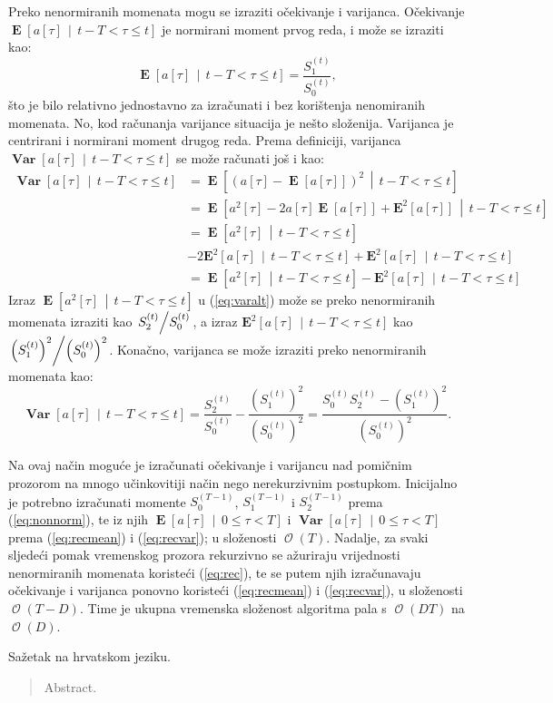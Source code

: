 \documentclass[lmodern, utf8, diplomski, numeric]{fer}
\newcommand{\E}[1]{\operatorname{\mathbf{E}}\q[#1\w]}
\newcommand{\Esq}[1]{\operatorname{\mathbf{E}^2}\q[#1\w]}
\newcommand{\Efromto}[2]{\operatorname{\mathbf{E}}\q[#1\, \middle\vert\, #2\w]}
\newcommand{\Esqfromto}[2]{\operatorname{\mathbf{E}^2}\q[#1\, \middle\vert\, #2\w]}
\newcommand{\Varfromto}[2]{\operatorname{\mathbf{Var}}\q[#1\, \middle\vert\, #2\w]}
\newcommand{\bigO}[1]{\operatorname{\mathcal{O}}\q(#1\w)}
\newcommand{\q}{\left}
\newcommand{\w}{\right}
\begin{document}
  Preko nenormiranih momenata mogu se izraziti očekivanje i varijanca.
  Očekivanje $\Efromto{a\q[\tau\w]}{t - T < \tau \le t}$ je normirani moment prvog reda, i može se izraziti kao:
  \begin{equation}
  \label{eq:recmean}
  \Efromto{a\q[\tau\w]}{t - T < \tau \le t} = \frac{S_1^{(t)}}{S_0^{(t)}},
  \end{equation}
  što je bilo relativno jednostavno za izračunati i bez korištenja nenomiranih momenata.
  No, kod računanja varijance situacija je nešto složenija.
  Varijanca je centrirani i normirani moment drugog reda.
  Prema definiciji, varijanca $\Varfromto{a\q[\tau\w]}{t - T < \tau \le t}$ se može računati još i kao:
  \begin{align}
    \Varfromto{a\q[\tau\w]}{t - T < \tau \le t} &= \Efromto{\q(a\q[\tau\w] - \E{a\q[\tau\w]} \w)^2}{t - T < \tau \le t} \nonumber \\
    &= \Efromto{a^2\q[\tau\w] - 2 a\q[\tau\w] \E{a\q[\tau\w]} + \Esq{a\q[\tau\w]}}{t - T < \tau \le t} \nonumber \\
    &= \Efromto{a^2\q[\tau\w]}{t - T < \tau \le t} \nonumber \\
    & - 2\Esqfromto{a\q[\tau\w]}{t - T < \tau \le t} + \Esqfromto{a\q[\tau\w]}{t - T < \tau \le t} \nonumber \\
    \label{eq:varalt}
    &= \Efromto{a^2\q[\tau\w]}{t - T < \tau \le t} - \Esqfromto{a\q[\tau\w]}{t - T < \tau \le t}
  \end{align}
  Izraz $\Efromto{a^2\q[\tau\w]}{t - T < \tau \le t}$ u (\ref{eq:varalt}) može se preko nenormiranih momenata izraziti kao $\q. S_2^{(t)} \middle/ S_0^{(t)} \w.$,
  a izraz $\Esqfromto{a\q[\tau\w]}{t - T < \tau \le t}$ kao $\q. \q(S_1^{(t)}\w)^2 \middle/ \q(S_0^{(t)}\w)^2 \w.$.
  Konačno, varijanca se može izraziti preko nenormiranih momenata kao:
  \begin{equation}
    \label{eq:recvar}
    \Varfromto{a\q[\tau\w]}{t - T < \tau \le t} = \frac{S_2^{(t)}}{S_0^{(t)}} - \frac{\q(S_1^{(t)}\w)^2}{\q(S_0^{(t)}\w)^2}
    = \frac{S_0^{(t)} S_2^{(t)} - \q(S_1^{(t)}\w)^2}{\q(S_0^{(t)}\w)^2}.
  \end{equation}
  
  Na ovaj način moguće je izračunati očekivanje i varijancu nad pomičnim prozorom na mnogo učinkovitiji način nego nerekurzivnim postupkom.
  Inicijalno je potrebno izračunati momente $S_0^{(T - 1)}$, $S_1^{(T - 1)} $ i $S_2^{(T - 1)}$ prema (\ref{eq:nonnorm}), te iz njih $\Efromto{a\q[\tau\w]}{0 \le \tau < T}$ i $\Varfromto{a\q[\tau\w]}{0 \le \tau < T}$ prema (\ref{eq:recmean}) i (\ref{eq:recvar}); u složenosti $\bigO{T}$.
  Nadalje, za svaki sljedeći pomak vremenskog prozora rekurzivno se ažuriraju vrijednosti nenormiranih momenata koristeći (\ref{eq:rec}), te se putem njih izračunavaju očekivanje i varijanca ponovno koristeći (\ref{eq:recmean}) i (\ref{eq:recvar}), u složenosti $\bigO{T - D}$.
  Time je ukupna vremenska složenost algoritma pala s $\bigO{DT}$ na $\bigO{D}$.

  \begin{sazetak}
  Sažetak na hrvatskom jeziku.

  \end{sazetak}

  \begin{abstract}
  Abstract.

  \end{abstract}
\end{document}
